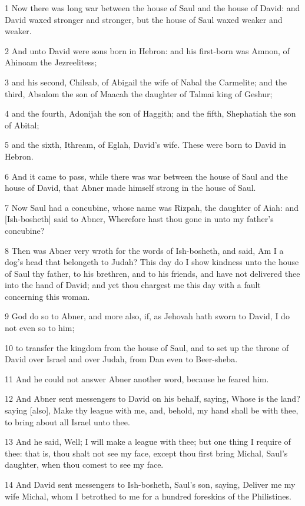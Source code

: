 \par 1 Now there was long war between the house of Saul and the house of David: and David waxed stronger and stronger, but the house of Saul waxed weaker and weaker.
\par 2 And unto David were sons born in Hebron: and his first-born was Amnon, of Ahinoam the Jezreelitess;
\par 3 and his second, Chileab, of Abigail the wife of Nabal the Carmelite; and the third, Absalom the son of Maacah the daughter of Talmai king of Geshur;
\par 4 and the fourth, Adonijah the son of Haggith; and the fifth, Shephatiah the son of Abital;
\par 5 and the sixth, Ithream, of Eglah, David's wife. These were born to David in Hebron.
\par 6 And it came to pass, while there was war between the house of Saul and the house of David, that Abner made himself strong in the house of Saul.
\par 7 Now Saul had a concubine, whose name was Rizpah, the daughter of Aiah: and [Ish-bosheth] said to Abner, Wherefore hast thou gone in unto my father's concubine?
\par 8 Then was Abner very wroth for the words of Ish-bosheth, and said, Am I a dog's head that belongeth to Judah? This day do I show kindness unto the house of Saul thy father, to his brethren, and to his friends, and have not delivered thee into the hand of David; and yet thou chargest me this day with a fault concerning this woman.
\par 9 God do so to Abner, and more also, if, as Jehovah hath sworn to David, I do not even so to him;
\par 10 to transfer the kingdom from the house of Saul, and to set up the throne of David over Israel and over Judah, from Dan even to Beer-sheba.
\par 11 And he could not answer Abner another word, because he feared him.
\par 12 And Abner sent messengers to David on his behalf, saying, Whose is the land? saying [also], Make thy league with me, and, behold, my hand shall be with thee, to bring about all Israel unto thee.
\par 13 And he said, Well; I will make a league with thee; but one thing I require of thee: that is, thou shalt not see my face, except thou first bring Michal, Saul's daughter, when thou comest to see my face.
\par 14 And David sent messengers to Ish-bosheth, Saul's son, saying, Deliver me my wife Michal, whom I betrothed to me for a hundred foreskins of the Philistines.
